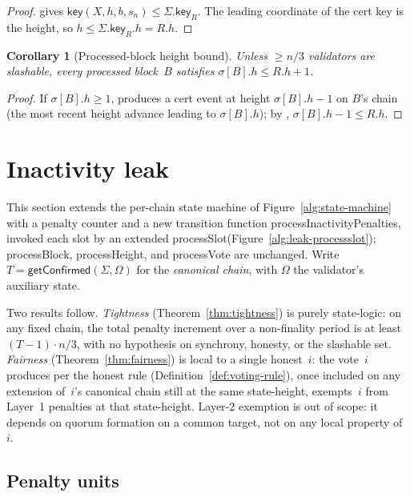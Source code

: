\documentclass{article}
\newcommand{\key}{\mathsf{key}}
\newcommand{\processSlot}{\textsf{processSlot}\xspace}
\newcommand{\processBlock}{\textsf{processBlock}\xspace}
\newcommand{\processHeight}{\textsf{processHeight}\xspace}
\newcommand{\processVote}{\textsf{processVote}\xspace}
\newcommand{\processInactivityPenalties}{\textsf{processInactivityPenalties}\xspace}
\newcommand{\getConfirmed}{\textsf{getConfirmed}\xspace}
\theoremstyle{plain}
\newtheorem{corollary}{Corollary}
\theoremstyle{definition}
\theoremstyle{remark}
\begin{document}
\begin{proof}
 gives $\key(X, h, b, s_n) \leq \Sigma.\key_R$. The leading coordinate of the cert key is the height, so $h \leq \Sigma.\key_R.h = R.h$.
\end{proof}

\begin{corollary}[Processed-block height bound]\label{rev:cor:processed-height-bound}
Unless $\geq n/3$ validators are slashable, every processed block~$B$ satisfies $\sigma[B].h \leq R.h + 1$.
\end{corollary}

\begin{proof}
If $\sigma[B].h \geq 1$,  produces a cert event at height $\sigma[B].h - 1$ on $B$'s chain (the most recent height advance leading to $\sigma[B].h$); by , $\sigma[B].h - 1 \leq R.h$.
\end{proof}

\section{Inactivity leak}

This section extends the per-chain state machine of Figure~\ref{alg:state-machine} with a penalty counter and a new transition function \processInactivityPenalties, invoked each slot by an extended \processSlot (Figure~\ref{alg:leak-processslot}); \processBlock, \processHeight, and \processVote are unchanged.
Write $T = \getConfirmed(\Sigma, \Omega)$ for the \emph{canonical chain}, with $\Omega$ the validator's auxiliary state.

Two results follow.
\emph{Tightness} (Theorem~\ref{thm:tightness}) is purely state-logic: on any fixed chain, the total penalty increment over a non-finality period is at least $(T-1) \cdot n/3$, with no hypothesis on synchrony, honesty, or the slashable set.
\emph{Fairness} (Theorem~\ref{thm:fairness}) is local to a single honest~$i$: the vote~$i$ produces per the honest rule (Definition~\ref{def:voting-rule}), once included on any extension of~$i$'s canonical chain still at the same state-height, exempts~$i$ from Layer~1 penalties at that state-height.
Layer-2 exemption is out of scope: it depends on quorum formation on a common target, not on any local property of~$i$.

\subsection{Penalty units}
\end{document}
